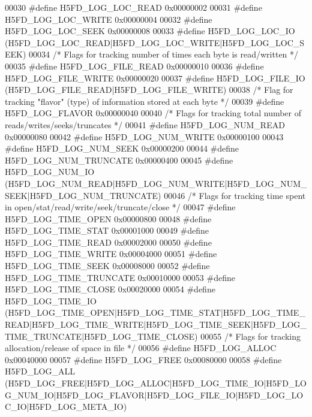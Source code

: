 \begin{DoxyCode}
00030 \textcolor{preprocessor}{#define H5FD\_LOG\_LOC\_READ   0x00000002}
00031 \textcolor{preprocessor}{#define H5FD\_LOG\_LOC\_WRITE  0x00000004}
00032 \textcolor{preprocessor}{#define H5FD\_LOG\_LOC\_SEEK   0x00000008}
00033 \textcolor{preprocessor}{#define H5FD\_LOG\_LOC\_IO     (H5FD\_LOG\_LOC\_READ|H5FD\_LOG\_LOC\_WRITE|H5FD\_LOG\_LOC\_SEEK)}
00034 \textcolor{comment}{/* Flags for tracking number of times each byte is read/written */}
00035 \textcolor{preprocessor}{#define H5FD\_LOG\_FILE\_READ  0x00000010}
00036 \textcolor{preprocessor}{#define H5FD\_LOG\_FILE\_WRITE 0x00000020}
00037 \textcolor{preprocessor}{#define H5FD\_LOG\_FILE\_IO    (H5FD\_LOG\_FILE\_READ|H5FD\_LOG\_FILE\_WRITE)}
00038 \textcolor{comment}{/* Flag for tracking "flavor" (type) of information stored at each byte */}
00039 \textcolor{preprocessor}{#define H5FD\_LOG\_FLAVOR     0x00000040}
00040 \textcolor{comment}{/* Flags for tracking total number of reads/writes/seeks/truncates */}
00041 \textcolor{preprocessor}{#define H5FD\_LOG\_NUM\_READ   0x00000080}
00042 \textcolor{preprocessor}{#define H5FD\_LOG\_NUM\_WRITE  0x00000100}
00043 \textcolor{preprocessor}{#define H5FD\_LOG\_NUM\_SEEK   0x00000200}
00044 \textcolor{preprocessor}{#define H5FD\_LOG\_NUM\_TRUNCATE 0x00000400}
00045 \textcolor{preprocessor}{#define H5FD\_LOG\_NUM\_IO     (H5FD\_LOG\_NUM\_READ|H5FD\_LOG\_NUM\_WRITE|H5FD\_LOG\_NUM\_SEEK|H5FD\_LOG\_NUM\_TRUNCATE)}
00046 \textcolor{comment}{/* Flags for tracking time spent in open/stat/read/write/seek/truncate/close */}
00047 \textcolor{preprocessor}{#define H5FD\_LOG\_TIME\_OPEN  0x00000800}
00048 \textcolor{preprocessor}{#define H5FD\_LOG\_TIME\_STAT  0x00001000}
00049 \textcolor{preprocessor}{#define H5FD\_LOG\_TIME\_READ  0x00002000}
00050 \textcolor{preprocessor}{#define H5FD\_LOG\_TIME\_WRITE 0x00004000}
00051 \textcolor{preprocessor}{#define H5FD\_LOG\_TIME\_SEEK  0x00008000}
00052 \textcolor{preprocessor}{#define H5FD\_LOG\_TIME\_TRUNCATE 0x00010000}
00053 \textcolor{preprocessor}{#define H5FD\_LOG\_TIME\_CLOSE 0x00020000}
00054 \textcolor{preprocessor}{#define H5FD\_LOG\_TIME\_IO   
       (H5FD\_LOG\_TIME\_OPEN|H5FD\_LOG\_TIME\_STAT|H5FD\_LOG\_TIME\_READ|H5FD\_LOG\_TIME\_WRITE|H5FD\_LOG\_TIME\_SEEK|H5FD\_LOG\_TIME\_TRUNCATE|H5FD\_LOG\_TIME\_CLOSE)}
00055 \textcolor{comment}{/* Flags for tracking allocation/release of space in file */}
00056 \textcolor{preprocessor}{#define H5FD\_LOG\_ALLOC      0x00040000}
00057 \textcolor{preprocessor}{#define H5FD\_LOG\_FREE       0x00080000}
00058 \textcolor{preprocessor}{#define H5FD\_LOG\_ALL       
       (H5FD\_LOG\_FREE|H5FD\_LOG\_ALLOC|H5FD\_LOG\_TIME\_IO|H5FD\_LOG\_NUM\_IO|H5FD\_LOG\_FLAVOR|H5FD\_LOG\_FILE\_IO|H5FD\_LOG\_LOC\_IO|H5FD\_LOG\_META\_IO)}

\end{DoxyCode}
